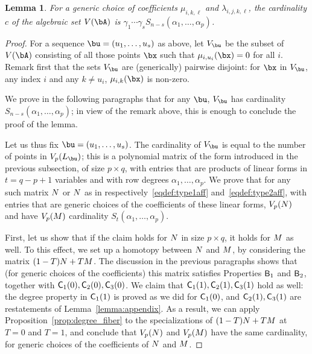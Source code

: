 \documentclass[12pt]{article}
\newtheorem{lemma}[definition]{Lemma}
\begin{document}
\begin{lemma}
  For a generic choice of coefficients $\mu_{i,k,\ell}$ and
  $\lambda_{i,j,k,\ell}$, the cardinality $c$ of the algebraic set
  $V(\bA)$ is $\gamma_1 \cdots \gamma_s
  S_{n-s}(\alpha_1,\dots,\alpha_p)$.
\end{lemma}
\begin{proof}
  For a sequence $\bu=(u_1,\dots,u_s)$ as above, let $V_\bu$ be the
  subset of $V(\bA)$ consisting of all those points $\bx$ such that
  $\mu_{i,u_i}(\bx)=0$ for all $i$. Remark first that the sets $V_\bu$
  are (generically) pairwise disjoint: for $\bx$ in $V_\bu$, any index
  $i$ and any $k \ne u_i$, $\mu_{i,k}(\bx)$ is non-zero.
  
  We prove in the following paragraphs that for any $\bu$, $V_\bu$ has
  cardinality $S_{n-s}(\alpha_1,\dots,\alpha_p)$; in view of the
  remark above, this is enough to conclude the proof of the lemma.

  Let us thus fix $\bu=(u_1,\dots,u_s)$. The cardinality of $V_\bu$ is
  equal to the number of points in $V_p(\mL_\bu)$; this is a
  polynomial matrix of the form introduced in the previous subsection,
  of size $p \times q$, with entries that are products of linear forms
  in $t=q-p+1$ variables and with row degrees
  $\alpha_1,\dots,\alpha_p$.  We prove that for any such matrix ${N}$
  or ${N}$ as in respectively~\eqref{eqdef:type1aff}
  and~\eqref{eqdef:type2aff}, with entries that are generic choices of
  the coefficients of these linear forms, $V_p({N})$ and have
  $V_p({M})$ cardinality $S_{t}(\alpha_1,\dots,\alpha_p)$.
  
  First, let us show that if the claim holds for ${N}$ in size $p
  \times q$, it holds for ${M}$ as well. To this effect, we set up a
  homotopy between ${N}$ and ${M}$, by considering the matrix
  $(1-T){N} + T{M}$.  The discussion in the previous paragraphs shows
  that (for generic choices of the coefficients) this matrix satisfies
  Properties $\mathsf{B}_1$ and $\mathsf{B}_2$, together with
  $\mathsf{C}_1(0),\mathsf{C}_2(0),\mathsf{C}_3(0)$.  We claim that
  $\mathsf{C}_1(1),\mathsf{C}_2(1),\mathsf{C}_3(1)$ hold as well: the degree property
  in $\mathsf{C}_1(1)$ is proved as we did for $\mathsf{C}_1(0)$, and
  $\mathsf{C}_2(1),\mathsf{C}_3(1)$ are restatements of
  Lemma~\ref{lemma:appendix}. As a result, we can apply
  Proposition~\ref{prop:degree_fiber} to the specializations of
  $(1-T){N} + T{M}$ at $T=0$ and $T=1$, and conclude that $V_p({N})$
  and $V_p({M})$ have the same cardinality, for generic choices of
  the coefficients of ${N}$ and ${M}$.


\end{proof}
\end{document}
